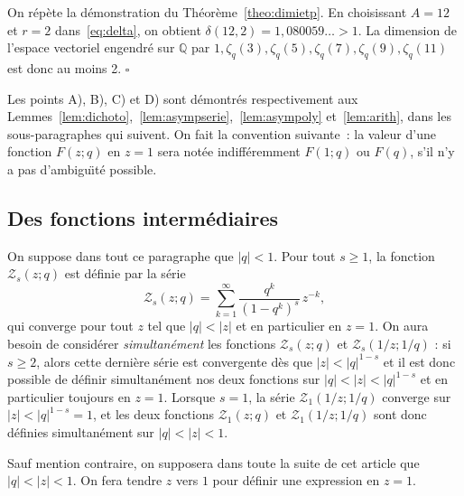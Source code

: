 \documentclass[12pt]{amsart}
\newcommand{\io}{\infty}
\theoremstyle{remark}
\numberwithin{equation}{section}
\begin{document}
\medskip
{} 
On r{\'e}p{\`e}te la d{\'e}monstration du Th{\'e}or{\`e}me~\ref{theo:dimietp}.
En choisissant $A=12$ et $r=2$ dans~\eqref{eq:delta}, 
on obtient $\delta(12,2)=1,080059\ldots>1$. La dimension
de l'espace vectoriel engendr{\'e} sur $\mathbb{Q}$ par $1,\zeta_q(3),\zeta_q(5),
\zeta_q(7),\zeta_q(9),
\zeta_q(11)$ est donc au moins 2. $\square$ 

\medskip
Les points A), B), C) et D)  sont d{\'e}montr{\'e}s respectivement aux 
Lemmes~\ref{lem:dichoto},~\ref{lem:asympserie},~\ref{lem:asympoly} et~\ref{lem:arith}, dans 
les sous-paragraphes qui suivent. On fait la convention 
suivante~: la valeur d'une fonction
$F(z;q)$ en $z=1$ sera not{\'e}e indiff{\'e}remment  $F(1;q)$ ou $F(q)$,
s'il n'y a pas d'ambigu{\"\i}t{\'e} possible.




\subsection{Des fonctions interm{\'e}diaires} 
On suppose dans tout ce paragraphe que $\vert q\vert <1$. Pour tout $s \ge 1$, la fonction 
$\mathcal{Z}_s(z;q)$ est d{\'e}finie par la s{\'e}rie 
$$
\mathcal{Z}_{s}(z;q)=\sum_{k=1}^{\io}\frac{q^k}{(1-q^k)^s}\,z^{-k},
$$ 
qui converge pour tout $z$ tel que 
$\vert q\vert <\vert z\vert $ et en particulier en $z=1$. 
On aura besoin de consid{\'e}rer 
{\it simultan{\'e}ment} les fonctions $\mathcal{Z}_s(z;q)$ et 
$\mathcal{Z}_s(1/z;1/q)$ : si $s\ge 2$, alors 
cette derni{\`e}re s{\'e}rie est convergente d{\`e}s que $\vert z\vert <\vert q\vert^{1-s}$ 
et il est donc possible de d{\'e}finir  simultan{\'e}ment nos deux  fonctions 
sur $\vert q\vert <\vert z\vert <\vert q\vert^{1-s}$ et en particulier toujours en $z=1$. 
Lorsque $s=1$, la s{\'e}rie  $\mathcal{Z}_1(1/z;1/q)$  converge sur 
$\vert z\vert <\vert q\vert^{1-s}=1$, 
et les deux fonctions $\mathcal{Z}_1(z;q)$ et $\mathcal{Z}_1(1/z;1/q)$ sont 
donc d{\'e}finies 
simultan{\'e}ment sur $\vert q\vert <\vert z\vert < 1$. 

\medskip
Sauf mention contraire, on supposera  dans toute la suite de cet article que 
$\vert q\vert <\vert z\vert < 1$. On fera  
tendre $z$ vers $1$ pour  d{\'e}finir une expression en $z=1$. 
\medskip
\end{document}
